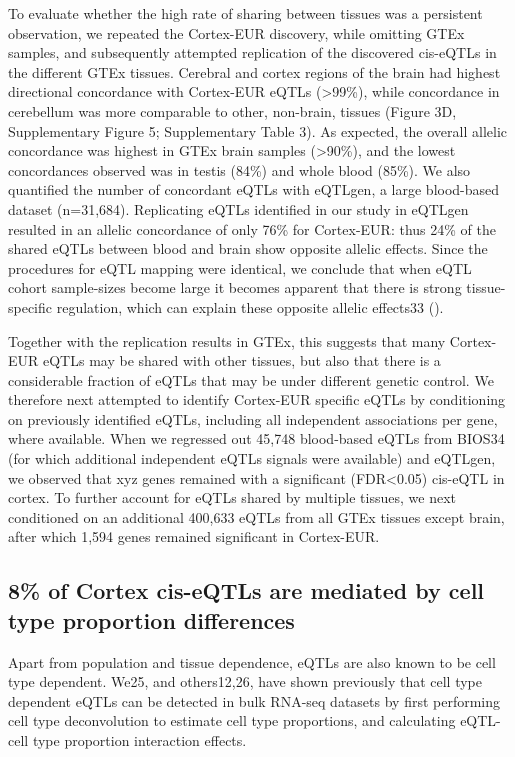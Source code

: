 To evaluate whether the high rate of sharing between tissues was a persistent observation, we repeated the Cortex-EUR discovery, while omitting GTEx samples, and subsequently attempted replication of the discovered cis-eQTLs in the different GTEx tissues\cite{consortiumGTExConsortiumAtlas2020}. Cerebral and cortex regions of the brain had highest directional concordance with Cortex-EUR eQTLs (>99\%), while concordance in cerebellum was more comparable to other, non-brain, tissues (Figure 3D, Supplementary Figure 5; Supplementary Table 3). As expected, the overall allelic concordance was highest in GTEx brain samples (>90\%), and the lowest concordances observed was in testis (84\%) and whole blood (85\%). We also quantified the number of concordant eQTLs with eQTLgen, a large blood-based dataset (n=31,684). Replicating eQTLs identified in our study in eQTLgen resulted in an allelic concordance of only 76\% for Cortex-EUR: thus 24\% of the shared eQTLs between blood and brain show opposite allelic effects. Since the procedures for eQTL mapping were identical, we conclude that when eQTL cohort sample-sizes become large it becomes apparent that there is strong tissue-specific regulation, which can explain these opposite allelic effects33 (). 

Together with the replication results in GTEx, this suggests that many Cortex-EUR eQTLs may be shared with other tissues, but also that there is a considerable fraction of eQTLs that may be under different genetic control. We therefore next attempted to identify Cortex-EUR specific eQTLs by conditioning on previously identified eQTLs, including all independent associations per gene, where available. When we regressed out 45,748 blood-based eQTLs from BIOS34 (for which additional independent eQTLs signals were available) and eQTLgen, we observed that xyz genes remained with a significant (FDR<0.05) cis-eQTL in cortex. To further account for eQTLs shared by multiple tissues, we next conditioned on an additional 400,633 eQTLs from all GTEx tissues except brain, after which 1,594 genes remained significant in Cortex-EUR.

\subsection{8\% of Cortex cis-eQTLs are mediated by cell type proportion differences}
	
Apart from population and tissue dependence, eQTLs are also known to be cell type dependent. We25, and others12,26, have shown previously that cell type dependent eQTLs can be detected in bulk RNA-seq datasets by first performing cell type deconvolution to estimate cell type proportions, and calculating eQTL-cell type proportion interaction effects.  

